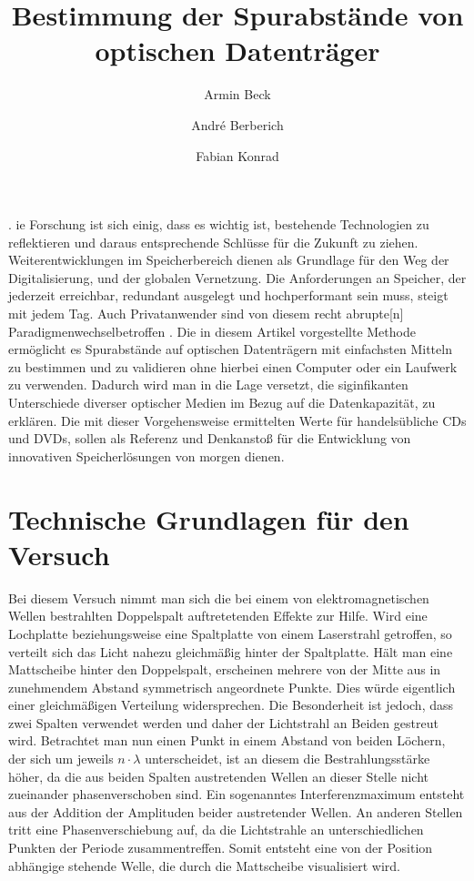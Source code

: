 \documentclass[9pt,twocolumn,twoside]{pnas-new}
\title{Bestimmung der Spurabstände von optischen Datenträger}
\author[a]{Armin Beck}
\author[a]{André Berberich}
\author[a]{Fabian Konrad}
\affil[a]{Student der DHBW Mosbach}
\begin{document}
\verticaladjustment{-2pt}

\maketitle
\thispagestyle{firststyle}
.
ie Forschung ist sich einig, dass es wichtig ist, bestehende Technologien zu reflektieren und daraus entsprechende Schlüsse für die Zukunft zu ziehen. Weiterentwicklungen im Speicherbereich dienen als Grundlage für den Weg der Digitalisierung, und der globalen Vernetzung. 
Die Anforderungen an Speicher, der jederzeit erreichbar, redundant ausgelegt und hochperformant sein muss, steigt mit jedem Tag.
Auch Privatanwender sind von diesem \glqq recht abrupte[n] Paradigmenwechsel\grqq \space betroffen \cite[Heft 10/2012 S.102]{CT1990}.
Die in diesem Artikel vorgestellte Methode ermöglicht es Spurabstände auf optischen Datenträgern mit einfachsten Mitteln zu bestimmen und zu validieren ohne hierbei einen Computer oder ein Laufwerk zu verwenden. Dadurch wird man in die Lage versetzt, die siginfikanten Unterschiede diverser optischer Medien im Bezug auf die Datenkapazität, zu erklären.
Die mit dieser Vorgehensweise ermittelten Werte für handelsübliche CDs und DVDs, sollen als Referenz und Denkanstoß für die Entwicklung von innovativen Speicherlösungen von morgen dienen.

\section*{Technische Grundlagen für den Versuch}
Bei diesem Versuch nimmt man sich die bei einem von elektromagnetischen Wellen bestrahlten Doppelspalt auftretetenden Effekte zur Hilfe. Wird eine Lochplatte beziehungsweise eine Spaltplatte von einem Laserstrahl getroffen, so verteilt sich das Licht nahezu gleichmäßig hinter der Spaltplatte. Hält man eine Mattscheibe hinter den Doppelspalt, erscheinen mehrere von der Mitte aus in zunehmendem Abstand symmetrisch angeordnete Punkte. Dies würde eigentlich einer gleichmäßigen Verteilung widersprechen. Die Besonderheit ist jedoch, dass zwei Spalten verwendet werden und daher der Lichtstrahl an Beiden gestreut wird. Betrachtet man nun einen Punkt in einem Abstand von beiden Löchern, der sich um jeweils \begin{math}n\cdot\lambda\end{math} unterscheidet, ist an diesem die Bestrahlungsstärke höher, da die aus beiden Spalten austretenden Wellen an dieser Stelle nicht zueinander phasenverschoben sind. Ein sogenanntes Interferenzmaximum entsteht aus der Addition der Amplituden beider austretender Wellen. An anderen Stellen tritt eine Phasenverschiebung auf, da die Lichtstrahle an unterschiedlichen Punkten der Periode zusammentreffen. Somit entsteht eine von der Position abhängige stehende Welle, die durch die Mattscheibe visualisiert wird.
\end{document}

